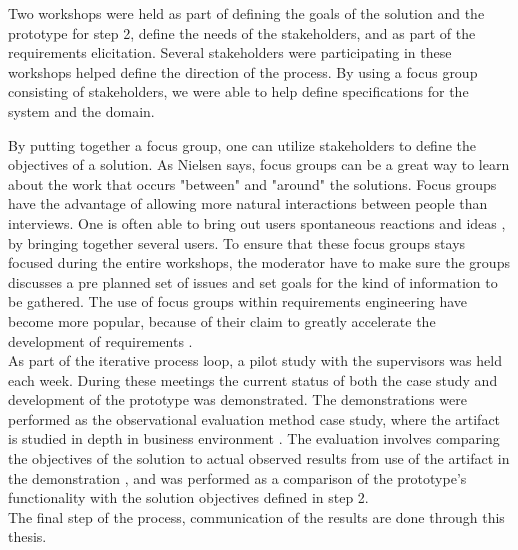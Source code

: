 Two workshops were held as part of defining the goals of the solution and the 
prototype for step 2, define the needs of the stakeholders, and as part of the 
requirements elicitation. Several stakeholders were participating in these
workshops helped define the direction of the process. By using a focus group 
consisting of stakeholders, we were able to help define specifications for the 
system and the domain. 


By putting together a focus group, one can utilize stakeholders to define the
objectives of a solution. As Nielsen \cite{FocusGroupstoStudyWorkPractice} 
says, focus groups can be a great way to learn about the work that occurs 
"between" and "around" the solutions. Focus groups have the advantage of allowing more natural interactions between people than interviews. One is often able to bring out users spontaneous reactions and ideas \cite{nielsen1997use}, 
by bringing together several users. To ensure that these focus groups stays 
focused during the entire workshops, the moderator have to make sure the 
groups discusses a pre planned set of issues and set goals for the kind of 
information to be gathered. The use of focus groups within requirements 
engineering have become more popular, because of their claim to greatly 
accelerate the development of requirements \cite{goguen1993techniques}. \\

As part of the iterative process loop, a pilot study with the supervisors was 
held each week. During these meetings the current status of both the case 
study and development of the prototype was demonstrated. The demonstrations 
were performed as the observational evaluation method case study, where the 
artifact is studied in depth in business environment \cite{von2004design}. The 
evaluation involves comparing the objectives of the solution to actual 
observed results from use of the artifact in the demonstration 
\cite{peffers2006design}, and was performed as a comparison of the prototype's 
functionality with the solution objectives defined in step 2. \\

The final step of the process, communication of the results are done through this thesis.



